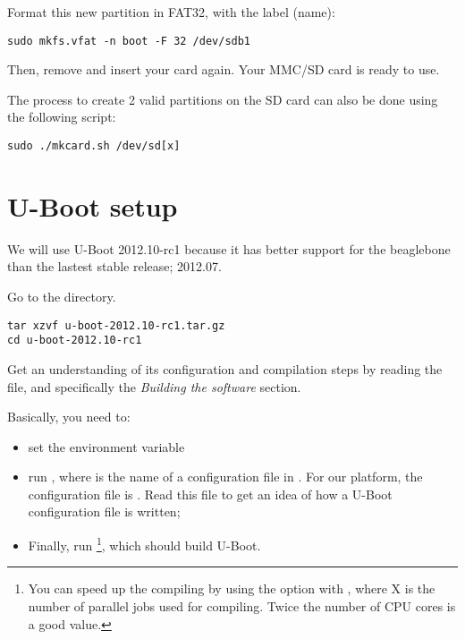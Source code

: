 Format this new partition in FAT32, with the  label (name):

\begin{verbatim}
sudo mkfs.vfat -n boot -F 32 /dev/sdb1
\end{verbatim}

Then, remove and insert your card again.
Your MMC/SD card is ready to use.

The process to create 2 valid partitions on the SD card can also be done using the following script:

\begin{verbatim}
sudo ./mkcard.sh /dev/sd[x]
\end{verbatim}


\section{U-Boot setup}

We will use U-Boot 2012.10-rc1 because it has better support for the beaglebone than the lastest stable release; 2012.07.

Go to the  directory.

\begin{verbatim}
tar xzvf u-boot-2012.10-rc1.tar.gz
cd u-boot-2012.10-rc1
\end{verbatim}

Get an understanding of its configuration and compilation steps by
reading the  file, and specifically the {\em Building the
  software} section.

Basically, you need to:

\begin{itemize}

\item set the  environment variable

\item run , where  is the name
  of a configuration file in . For our
  platform, the configuration file is
  . Read this file to get an idea of
  how a U-Boot configuration file is written;

\item Finally, run \footnote{You can speed up the compiling
  by using the  option with , where X is the number of parallel
  jobs used for compiling. Twice the number of CPU cores is a good
  value.}, which should build U-Boot.

\end{itemize}

